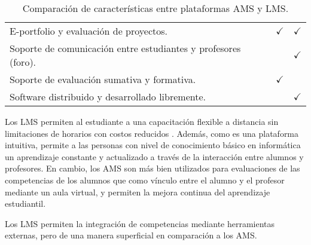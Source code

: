 \begin{table}[H]
{\begin{tabular}{lllcc}
		\multicolumn{3}{l}{E-portfolio y evaluación de proyectos.}                                              & $\checkmark$         & $\checkmark$         \\
		\multicolumn{3}{l}{Soporte de comunicación entre estudiantes y profesores (foro).}                      &           & $\checkmark$         \\
		\multicolumn{3}{l}{Soporte de evaluación sumativa y formativa.}                                         & $\checkmark$         &           \\
		\multicolumn{3}{l}{Software distribuido y desarrollado libremente.}                                     &           & $\checkmark$         \\
		\bottomrule
	\end{tabular}
	}
	\caption{Comparación de características entre plataformas AMS y LMS.}
  \label{comparacion_ams_lms}
\end{table}

Los LMS permiten al estudiante a una capacitación flexible a distancia sin limitaciones de horarios con costos reducidos \citep{de2016design}. Además, como es una plataforma intuitiva, permite a las personas con nivel de conocimiento básico en informática un aprendizaje constante y actualizado a través de la interacción entre alumnos y profesores. En cambio, los AMS son más bien utilizados para evaluaciones de las competencias de los alumnos que como vínculo entre el alumno y el profesor mediante un aula virtual, y permiten la mejora continua del aprendizaje estudiantil.

Los LMS permiten la integración de competencias mediante herramientas externas, pero de una manera superficial en comparación a los AMS.